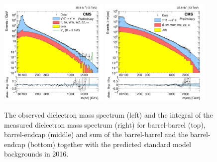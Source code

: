 \begin{figure}[ht]
\begin{center}
    \includegraphics[width=0.47\textwidth]{figures/Zprime/2016/mass/massHist}
    \includegraphics[width=0.47\textwidth]{figures/Zprime/2016/mass/cMassHist}
    \caption{The observed dielectron mass spectrum (left) and the integral of the measured dielectron mass spectrum (right) for barrel-barrel (top), barrel-endcap (middle) and sum of the barrel-barrel and the barrel-endcap (bottom) together with the predicted standard model backgrounds in 2016.}
    \label{mass_2016}
  \end{center}
\end{figure}


